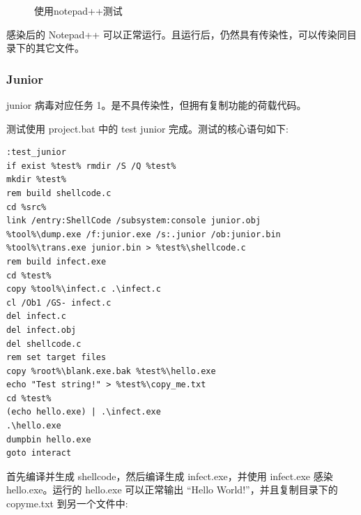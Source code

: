 \documentclass[UTF8]{ctexart}
\begin{document}
    \begin{figure}[H]
    \centering
        \caption{使用notepad++测试}
        \label{fig:notepad-test}
    \end{figure}

    感染后的 Notepad++ 可以正常运行。且运行后，仍然具有传染性，可以传染同目录下的其它文件。

    \subsubsection{Junior}

    junior 病毒对应任务 1。是不具传染性，但拥有复制功能的荷载代码。

    测试使用 project.bat 中的 test junior 完成。测试的核心语句如下:

    \begin{lstlisting}[caption={test junior}, captionpos=b]
:test_junior
if exist %test% rmdir /S /Q %test%
mkdir %test%
rem build shellcode.c
cd %src%
link /entry:ShellCode /subsystem:console junior.obj
%tool%\dump.exe /f:junior.exe /s:.junior /ob:junior.bin
%tool%\trans.exe junior.bin > %test%\shellcode.c
rem build infect.exe
cd %test%
copy %tool%\infect.c .\infect.c
cl /Ob1 /GS- infect.c
del infect.c
del infect.obj
del shellcode.c
rem set target files
copy %root%\blank.exe.bak %test%\hello.exe
echo "Test string!" > %test%\copy_me.txt
cd %test%
(echo hello.exe) | .\infect.exe
.\hello.exe
dumpbin hello.exe
goto interact
    \end{lstlisting}

    首先编译并生成 shellcode，然后编译生成 infect.exe，并使用 infect.exe 感染 hello.exe。运行的 hello.exe 可以正常输出 ``Hello World!''，并且复制目录下的 copyme.txt 到另一个文件中:
    
\end{document}
